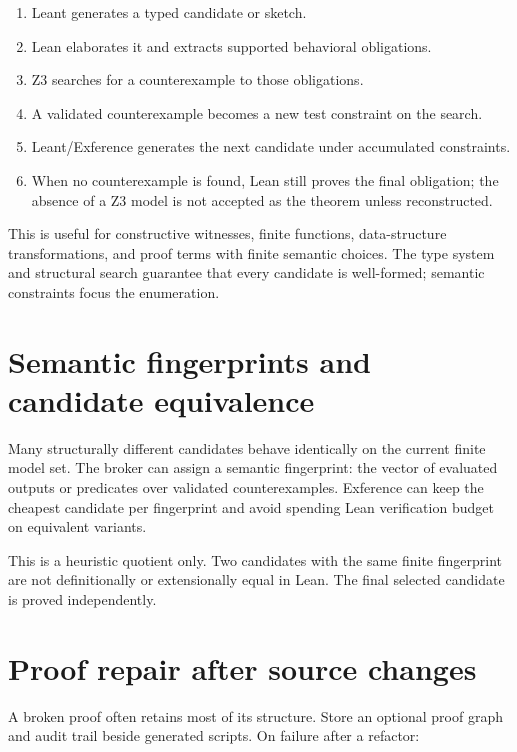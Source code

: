 \documentclass[11pt,letterpaper,openany]{report}
\begin{document}
\begin{enumerate}
  \item Leant generates a typed candidate or sketch.
  \item Lean elaborates it and extracts supported behavioral obligations.
  \item Z3 searches for a counterexample to those obligations.
  \item A validated counterexample becomes a new test constraint on the search.
  \item Leant/Exference generates the next candidate under accumulated constraints.
  \item When no counterexample is found, Lean still proves the final obligation; the
        absence of a Z3 model is not accepted as the theorem unless reconstructed.
\end{enumerate}

This is useful for constructive witnesses, finite functions, data-structure
transformations, and proof terms with finite semantic choices. The type system and
structural search guarantee that every candidate is well-formed; semantic constraints
focus the enumeration.

\section{Semantic fingerprints and candidate equivalence}

Many structurally different candidates behave identically on the current finite model
set. The broker can assign a semantic fingerprint: the vector of evaluated outputs or
predicates over validated counterexamples. Exference can keep the cheapest candidate
per fingerprint and avoid spending Lean verification budget on equivalent variants.

This is a heuristic quotient only. Two candidates with the same finite fingerprint
are not definitionally or extensionally equal in Lean. The final selected candidate is
proved independently.

\section{Proof repair after source changes}

A broken proof often retains most of its structure. Store an optional proof graph and
audit trail beside generated scripts. On failure after a refactor:
\end{document}
